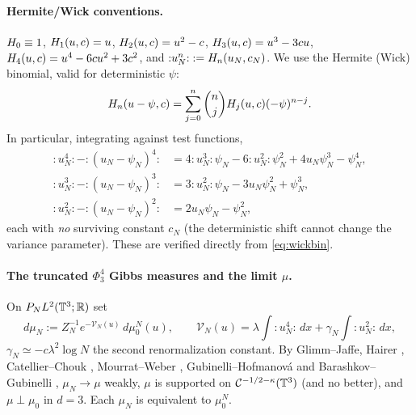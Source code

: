 \paragraph{Hermite/Wick conventions.}
$H_0\equiv1$, $H_1(u,c)=u$, $H_2(u,c)=u^2-c$, $H_3(u,c)=u^3-3cu$,
$H_4(u,c)=u^4-6cu^2+3c^2$, and ${:}u_N^n{:}:=H_n(u_N,c_N)$. We use the
Hermite (Wick) binomial, valid for deterministic $\psi$:
\begin{equation}\label{eq:wickbin}
H_n(u-\psi,c)=\sum_{j=0}^n\binom njH_j(u,c)(-\psi)^{n-j}.
\end{equation}
In particular, integrating against test functions,
\begin{align}
{:}u_N^4{:}-{:}(u_N-\psi_N)^4{:}&=4{:}u_N^3{:}\psi_N-6{:}u_N^2{:}\psi_N^2+4u_N\psi_N^3-\psi_N^4,\label{eq:diff4}\\
{:}u_N^3{:}-{:}(u_N-\psi_N)^3{:}&=3{:}u_N^2{:}\psi_N-3u_N\psi_N^2+\psi_N^3,\label{eq:diff3}\\
{:}u_N^2{:}-{:}(u_N-\psi_N)^2{:}&=2u_N\psi_N-\psi_N^2,\label{eq:diff2}
\end{align}
each with \emph{no} surviving constant $c_N$ (the deterministic shift cannot change the
variance parameter). These are verified directly from \eqref{eq:wickbin}.

\paragraph{The truncated $\Phi^4_3$ Gibbs measures and the limit $\mu$.}
On $P_N L^2(\mathbb{T}^3;\mathbb{R})$ set
\begin{equation}\label{eq:muN}
d\mu_N:=Z_N^{-1}e^{-\mathcal V_N(u)}\,d\mu_0^N(u),\qquad
\mathcal V_N(u)=\lambda\!\int\!{:}u_N^4{:}\,dx+\gamma_N\!\int\!{:}u_N^2{:}\,dx,
\end{equation}
$\gamma_N\simeq-c\lambda^2\log N$ the second renormalization constant. By Glimm--Jaffe,
Hairer \cite{Hairer14}, Catellier--Chouk \cite{CC18}, Mourrat--Weber \cite{MW17},
Gubinelli--Hofmanov\'a \cite{GH21} and Barashkov--Gubinelli \cite{BG20}, $\mu_N\to\mu$
weakly, $\mu$ is supported on $\mathcal{C}^{-1/2-\kappa}(\mathbb{T}^3)$ (and no better), and
$\mu\perp\mu_0$ in $d=3$. Each $\mu_N$ is equivalent to $\mu_0^N$.

